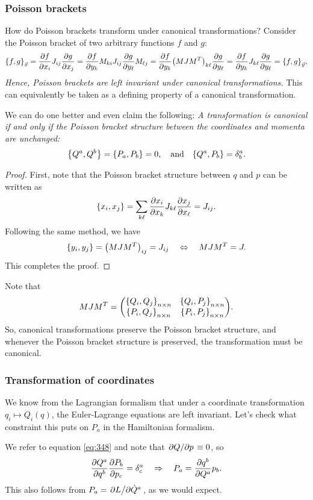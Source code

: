 \documentclass{article}
\begin{document}
\subsubsection{Poisson brackets}
How do Poisson brackets transform under canonical transformations? Consider the Poisson bracket of two arbitrary functions $ f $ and $ g $:
\begin{equation}
	\qty{f, g}_{\vec{x}} = \pdv{f}{x_{i}} J_{ij} \pdv{g}{x_{j}} = \pdv{f}{y_{k}} M_{ki} J_{ij} \pdv{g}{y_{\ell}} M_{\ell j} = \pdv{f}{y_{k}} \qty(M J M^{T})_{k\ell} \pdv{g}{y_{\ell}} = \pdv{f}{y_{k}} J_{k\ell} \pdv{g}{y_{\ell}} = \qty{f,g}_{\vec{y}},
\end{equation}
\textit{Hence, Poisson brackets are left invariant under canonical transformations.} This can equivalently be taken as a defining property of a canonical transformation. 
\par
We can do one better and even claim the following: \textit{A transformation is canonical if and only if the Poisson bracket structure between the coordinates and momenta are unchanged:}
\begin{equation}
\qty{Q^{a}, Q^{b}} = \qty{P_{a}, P_{b}} = 0, \qq{and} \qty{Q^{a}, P_{b}} = \delta^{a}_{b}.
\end{equation}
\begin{proof}
	First, note that the Poisson bracket structure between $ q $ and $ p $ can be written as
	\[
		\qty{x_{i}, x_{j}} = \sum_{k\ell}\pdv{x_{i}}{x_{k}} J_{k\ell} \pdv{x_{j}}{x_{\ell}} = J_{ij}.	
	\]
	Following the same method, we have
	\begin{equation}
		\qty{y_{i}, y_{j}} = \qty(M J M^{T})_{ij} = J_{ij} \quad \Leftrightarrow \quad M J M^{T} = J.
	\end{equation}
	This completes the proof.
\end{proof}
Note that
\begin{equation}
	M J M^{T} = \mqty(\qty{Q_{i}, Q_{j}}_{n \times n} & \qty{Q_{i}, P_{j}}_{n \times n} \\
	\qty{P_{i}, Q_{j}}_{n \times n} & \qty{P_{i}, P_{j}}_{n \times n} ).
\end{equation}
So, canonical transformations preserve the Poisson bracket structure, and whenever the Poisson bracket structure is preserved, the transformation must be canonical.
\subsubsection*{Transformation of coordinates}
We know from the Lagrangian formalism that under a coordinate transformation $ q_{i} \longmapsto Q_{i}(q) $, the Euler-Lagrange equations are left invariant. Let's check what constraint this puts on $ P_{a} $ in the Hamiltonian formalism.
\par
We refer to equation \eqref{eq:348} and note that $ \pdv*{Q}{p} \equiv 0 $, so
\[
	 \pdv{Q^{a}}{q^{b}} \pdv{P_{b}}{p_{c}} = \delta^{a}_{c} \quad \Rightarrow \quad P_{a} = \pdv{q^{b}}{Q^{a}} p_{b}.
\]
This also follows from $ P_{a} = \pdv*{L}{\dot{Q}^{a}} $, as we would expect.
\end{document}

